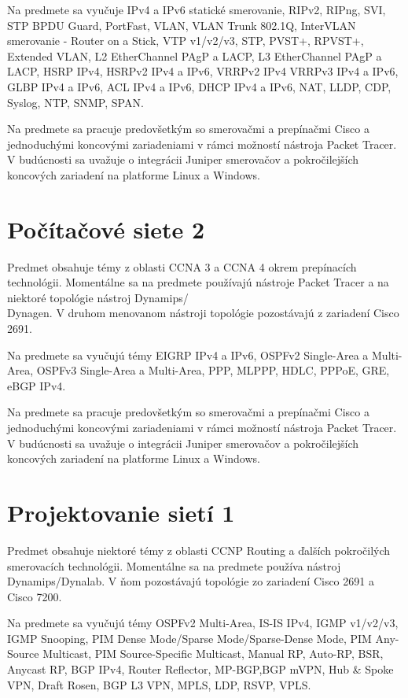 Na predmete sa vyučuje IPv4 a IPv6 statické smerovanie, RIPv2, RIPng, SVI, STP BPDU Guard, PortFast, VLAN, VLAN Trunk 802.1Q, InterVLAN smerovanie - Router on a Stick, VTP v1/v2/v3, STP, PVST+, RPVST+, Extended VLAN, L2 EtherChannel PAgP a LACP, L3 EtherChannel PAgP a LACP, HSRP IPv4, HSRPv2 IPv4 a IPv6, VRRPv2 IPv4 VRRPv3 IPv4 a IPv6, GLBP IPv4 a IPv6, ACL IPv4 a IPv6, DHCP IPv4 a IPv6, NAT, LLDP, CDP, Syslog, NTP, SNMP, SPAN.

Na predmete sa pracuje predovšetkým so smerovačmi a prepínačmi Cisco a jednoduchými koncovými zariadeniami v rámci možností nástroja Packet Tracer. V budúcnosti sa uvažuje o integrácii Juniper smerovačov a pokročilejších koncových zariadení na platforme Linux a Windows.




\section{Počítačové siete 2}

Predmet obsahuje témy z oblasti CCNA 3 a CCNA 4 okrem prepínacích technológii. Momentálne sa na predmete používajú nástroje Packet Tracer a na niektoré topológie nástroj Dynamips/\\Dynagen. V druhom menovanom nástroji topológie pozostávajú z zariadení Cisco 2691.

Na predmete sa vyučujú témy EIGRP IPv4 a IPv6, OSPFv2 Single-Area a Multi-Area, OSPFv3 Single-Area a Multi-Area, PPP, MLPPP, HDLC, PPPoE, GRE, eBGP IPv4.

Na predmete sa pracuje predovšetkým so smerovačmi a prepínačmi Cisco a jednoduchými koncovými zariadeniami v rámci možností nástroja Packet Tracer. V budúcnosti sa uvažuje o integrácii Juniper smerovačov a pokročilejších koncových zariadení na platforme Linux a Windows.




\section{Projektovanie sietí 1}

Predmet obsahuje niektoré témy z oblasti CCNP Routing a ďalších pokročilých smerovacích technológii. Momentálne sa na predmete používa nástroj Dynamips/Dynalab. V ňom pozostávajú topológie zo zariadení Cisco 2691 a Cisco 7200.

Na predmete sa vyučujú témy OSPFv2 Multi-Area, IS-IS IPv4, IGMP v1/v2/v3, IGMP Snooping, PIM Dense Mode/Sparse Mode/Sparse-Dense Mode, PIM Any-Source Multicast, PIM Source-Specific Multicast, Manual RP, Auto-RP, BSR, Anycast RP, BGP IPv4, Router Reflector, MP-BGP,BGP mVPN, Hub \& Spoke VPN, Draft Rosen, BGP L3 VPN, MPLS, LDP, RSVP, VPLS.

